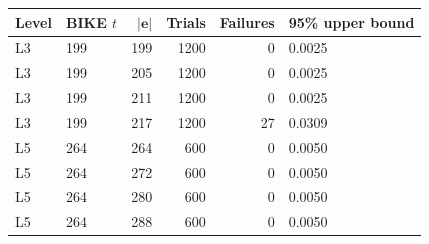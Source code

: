 \begin{tabular}{llrrrl}
\toprule
Level & BIKE $t$ & $|\mathbf e|$ & Trials & Failures & 95\% upper bound\\
\midrule
L3 & 199 & 199 & 1200 & 0 & 0.0025\\
L3 & 199 & 205 & 1200 & 0 & 0.0025\\
L3 & 199 & 211 & 1200 & 0 & 0.0025\\
L3 & 199 & 217 & 1200 & 27 & 0.0309\\
L5 & 264 & 264 & 600 & 0 & 0.0050\\
L5 & 264 & 272 & 600 & 0 & 0.0050\\
L5 & 264 & 280 & 600 & 0 & 0.0050\\
L5 & 264 & 288 & 600 & 0 & 0.0050\\
\bottomrule
\end{tabular}
